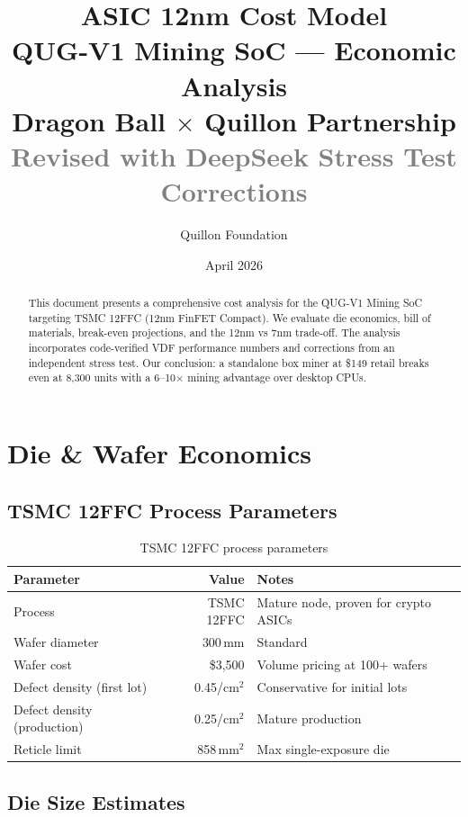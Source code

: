 \documentclass[11pt,a4paper]{article}
\title{
    \vspace{-1cm}
    {\Large\textbf{ASIC 12nm Cost Model}}\\[0.3cm]
    {\large QUG-V1 Mining SoC --- Economic Analysis}\\[0.3cm]
    {\normalsize Dragon Ball $\times$ Quillon Partnership}\\[0.5cm]
    {\small\textcolor{gray}{Revised with DeepSeek Stress Test Corrections}}
}
\author{Quillon Foundation}
\date{April 2026}
\begin{document}
\maketitle
\thispagestyle{fancy}

\begin{abstract}
This document presents a comprehensive cost analysis for the QUG-V1 Mining SoC targeting TSMC 12FFC (12nm FinFET Compact). We evaluate die economics, bill of materials, break-even projections, and the 12nm vs 7nm trade-off. The analysis incorporates code-verified VDF performance numbers and corrections from an independent stress test. Our conclusion: a standalone box miner at \$149 retail breaks even at 8,300 units with a 6--10$\times$ mining advantage over desktop CPUs.
\end{abstract}

\tableofcontents
\newpage

\section{Die \& Wafer Economics}

\subsection{TSMC 12FFC Process Parameters}

\begin{table}[h]
\centering
\begin{tabular}{lrl}
\toprule
\textbf{Parameter} & \textbf{Value} & \textbf{Notes} \\
\midrule
Process & TSMC 12FFC & Mature node, proven for crypto ASICs \\
Wafer diameter & 300\,mm & Standard \\
Wafer cost & \$3,500 & Volume pricing at 100+ wafers \\
Defect density (first lot) & 0.45/cm$^2$ & Conservative for initial lots \\
Defect density (production) & 0.25/cm$^2$ & Mature production \\
Reticle limit & 858\,mm$^2$ & Max single-exposure die \\
\bottomrule
\end{tabular}
\caption{TSMC 12FFC process parameters}
\end{table}

\subsection{Die Size Estimates}
\end{document}
